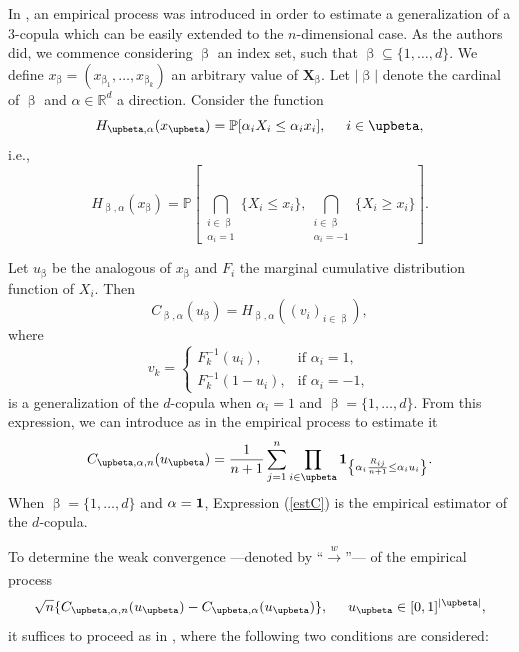 \documentclass[11pt,a4paper]{article}
\def\XX{{\mathbf X}}
\begin{document}
In \cite{Gar2013}, an empirical process was introduced in order to estimate a generalization of a $3$-copula which can be easily extended to the $n$-dimensional case. As the authors did, we commence considering $\upbeta$ an index set, such that $\upbeta\subseteq\{1,\ldots,d\}$. We define $x_\upbeta=(x_{\upbeta_1},\ldots,x_{\upbeta_k})$ an arbitrary value of $\XX_\upbeta$. Let $|\upbeta|$ denote the cardinal of $\upbeta$ and $\alpha\in\mathbb{R}^d$ a direction. Consider the function 
    \begin{equation}\label{H}
     H_{\upbeta,\alpha}(x_\upbeta)=\mathbb{P}[\alpha_iX_i\leq\alpha_ix_i],\hspace{0.5cm}i\in\upbeta,  
    \end{equation}
i.e.,$$
H_{\upbeta,\alpha}(x_\upbeta) = \mathbb{P}\left[ \bigcap_{\substack{i \in \upbeta \\ \alpha_i=1}} \{X_i \leq x_i\}, \bigcap_{\substack{i \in \upbeta \\ \alpha_i=-1}} \{X_i \geq x_i\} \right].
$$

Let $u_\upbeta$ be the analogous of $x_\upbeta$ and $F_i$ the marginal cumulative distribution function of $X_i$. Then 
\begin{equation}\label{C}
C_{\upbeta,\alpha}(u_\upbeta) = H_{\upbeta,\alpha}((v_i)_{i \in \upbeta}),
\end{equation}
where
$$
v_k =
\begin{cases}
F_k^{-1}(u_i), & \text{if } \alpha_i = 1, \\
F_k^{-1}(1-u_i), & \text{if } \alpha_i = -1,
\end{cases}$$
is a generalization of the $d$-copula when $\alpha_i=1$ and $\upbeta=\{1,\ldots,d\}$. From this expression, we can introduce as in \cite{Gar2013} the empirical process to estimate it
\begin{equation}\label{estC}
C_{\upbeta,\alpha,n}(u_\upbeta)=\frac{1}{n+1}\sum_{j=1}^n\prod_{i\in\upbeta}{\bf 1}_{\left\{\alpha_i\frac{R_{ij}}{n+1}\leq\alpha_iu_i\right\}}.    
\end{equation}
When $\upbeta=\{1,\ldots,d\}$ and $\alpha={\bf 1}$, Expression (\ref{estC}) is the empirical estimator of the $d$-copula.

To determine the weak convergence ---denoted by ``$\xrightarrow[]{w}$''--- of the empirical process 
$$\sqrt{n}\{C_{\upbeta,\alpha,n}(u_\upbeta)-C_{\upbeta,\alpha}(u_\upbeta)\}, \hspace{0.5cm} u_{\upbeta}\in [0,1]^{|\upbeta|},$$
it suffices to proceed as in \cite{Gar2013}, where the following two conditions are considered:
\end{document}

